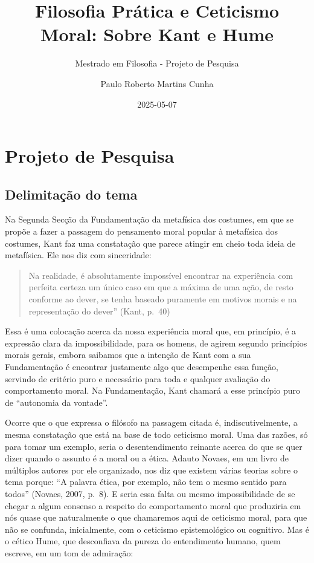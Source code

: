 \documentclass[
  brazilian,
  letterpaper,
  DIV=11,
  numbers=noendperiod]{scrartcl}
\title{Filosofia Prática e Ceticismo Moral: Sobre Kant e Hume}
\subtitle{Mestrado em Filosofia - Projeto de Pesquisa}
\author{Paulo Roberto Martins Cunha}
\date{2025-05-07}
\begin{document}
\maketitle


\section{Projeto de Pesquisa}\label{projeto-de-pesquisa}

\subsection{Delimitação do tema}\label{delimitauxe7uxe3o-do-tema}

Na Segunda Secção da Fundamentação da metafísica dos costumes, em que se
propõe a fazer a passagem do pensamento moral popular à metafísica dos
costumes, Kant faz uma constatação que parece atingir em cheio toda
ideia de metafísica. Ele nos diz com sinceridade:

\begin{quote}
Na realidade, é absolutamente impossível encontrar na experiência com
perfeita certeza um único caso em que a máxima de uma ação, de resto
conforme ao dever, se tenha baseado puramente em motivos morais e na
representação do dever'' (Kant, p.~40)
\end{quote}

Essa é uma colocação acerca da nossa experiência moral que, em
princípio, é a expressão clara da impossibilidade, para os homens, de
agirem segundo princípios morais gerais, embora saibamos que a intenção
de Kant com a sua Fundamentação é encontrar justamente algo que
desempenhe essa função, servindo de critério puro e necessário para toda
e qualquer avaliação do comportamento moral. Na Fundamentação, Kant
chamará a esse princípio puro de ``autonomia da vontade''.

Ocorre que o que expressa o filósofo na passagem citada é,
indiscutivelmente, a mesma constatação que está na base de todo
ceticismo moral. Uma das razões, só para tomar um exemplo, seria o
desentendimento reinante acerca do que se quer dizer quando o assunto é
a moral ou a ética. Adauto Novaes, em um livro de múltiplos autores por
ele organizado, nos diz que existem várias teorias sobre o tema porque:
``A palavra ética, por exemplo, não tem o mesmo sentido para todos''
(Novaes, 2007, p.~8). E seria essa falta ou mesmo impossibilidade de se
chegar a algum consenso a respeito do comportamento moral que produziria
em nós quase que naturalmente o que chamaremos aqui de ceticismo moral,
para que não se confunda, inicialmente, com o ceticismo epistemológico
ou cognitivo. Mas é o cético Hume, que desconfiava da pureza do
entendimento humano, quem escreve, em um tom de admiração:
\end{document}

